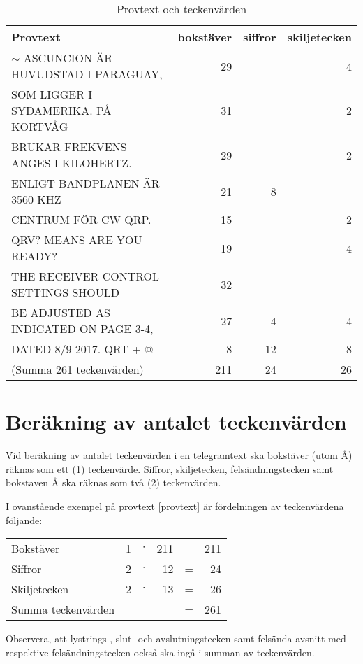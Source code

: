 \begin{table*}
  \begin{center}
    \begin{tabular}{l|r|r|r|}
	Provtext & bokstäver & siffror & skiljetecken\\ \hline
	$\sim$ ASCUNCION ÄR HUVUDSTAD I PARAGUAY, & 29 & & 4\\
	SOM LIGGER I SYDAMERIKA. PÅ KORTVÅG & 31 & & 2\\
	BRUKAR FREKVENS ANGES I KILOHERTZ. & 29 & & 2\\
	ENLIGT BANDPLANEN ÄR 3560 KHZ & 21 & 8 &\\
	CENTRUM FÖR CW QRP. & 15& & 2\\
	QRV? MEANS ARE YOU READY? & 19 & & 4 \\
	THE RECEIVER CONTROL SETTINGS SHOULD & 32 & &\\
	BE ADJUSTED AS INDICATED ON PAGE 3-4, & 27 & 4 & 4\\
	DATED 8/9 2017. QRT + @ & 8 & 12 & 8\\ \hline
	(Summa 261 teckenvärden)& 211 & 24 & 26\\
    \end{tabular}
    \caption{Provtext och teckenvärden}
    \label{tab:provtext}
  \end{center}
\end{table*}

\section[Teckenvärden]{Beräkning av antalet teckenvärden}

Vid beräkning av antalet teckenvärden i en telegramtext ska bokstäver (utom Å)
räknas som ett (1) teckenvärde.
Siffror, skiljetecken, felsändningstecken samt bokstaven Å ska räknas som två
(2) teckenvärden.

I ovanstående exempel på provtext \ref{provtext} är fördelningen av
teckenvärdena följande:

\begin{tabular}{lrcrcr}
	Bokstäver          & 1 & $\cdot$ & 211 & = & 211 \\
	Siffror            & 2 & $\cdot$ & 12  & = & 24  \\
	Skiljetecken       & 2 & $\cdot$ & 13  & = & 26  \\
	Summa teckenvärden &   &         &     & = & 261
\end{tabular}

Observera, att lystrings-, slut- och avslutningstecken samt felsända avsnitt med
respektive felsändningstecken också ska ingå i summan av teckenvärden.

